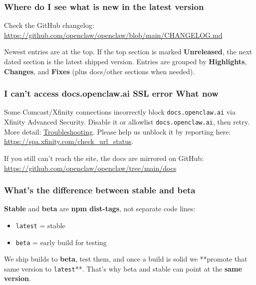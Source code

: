 \subsubsection{Where do I see what is new in the latest version}


Check the GitHub changelog:
\href{https://github.com/openclaw/openclaw/blob/main/CHANGELOG.md}{https://github.com/openclaw/openclaw/blob/main/CHANGELOG.md}

Newest entries are at the top. If the top section is marked \textbf{Unreleased}, the next dated
section is the latest shipped version. Entries are grouped by \textbf{Highlights}, \textbf{Changes}, and
\textbf{Fixes} (plus docs/other sections when needed).

\subsubsection{I can't access docs.openclaw.ai SSL error What now}


Some Comcast/Xfinity connections incorrectly block \texttt{docs.openclaw.ai} via Xfinity
Advanced Security. Disable it or allowlist \texttt{docs.openclaw.ai}, then retry. More
detail: \href{/help/troubleshooting\#docsopenclawai-shows-an-ssl-error-comcastxfinity}{Troubleshooting}.
Please help us unblock it by reporting here: \href{https://spa.xfinity.com/check\_url\_status}{https://spa.xfinity.com/check\_url\_status}.

If you still can't reach the site, the docs are mirrored on GitHub:
\href{https://github.com/openclaw/openclaw/tree/main/docs}{https://github.com/openclaw/openclaw/tree/main/docs}

\subsubsection{What's the difference between stable and beta}


\textbf{Stable} and \textbf{beta} are \textbf{npm dist-tags}, not separate code lines:

\begin{itemize}
  \item \texttt{latest} = stable
  \item \texttt{beta} = early build for testing
\end{itemize}


We ship builds to \textbf{beta}, test them, and once a build is solid we **promote
that same version to \texttt{latest}**. That's why beta and stable can point at the
\textbf{same version}.

